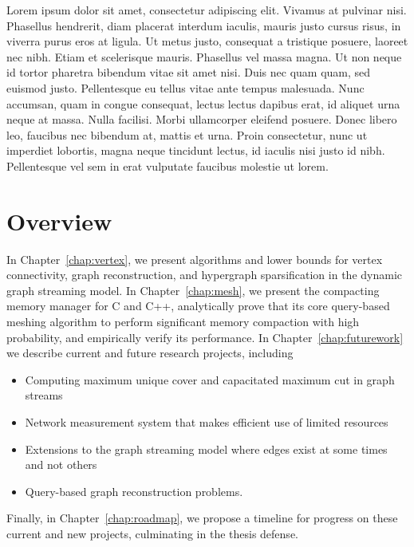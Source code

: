 \label{chap:intro}


Lorem ipsum dolor sit amet, consectetur adipiscing elit. Vivamus at pulvinar nisi. Phasellus hendrerit, diam placerat interdum iaculis, mauris justo cursus risus, in viverra purus eros at ligula. Ut metus justo, consequat a tristique posuere, laoreet nec nibh. Etiam et scelerisque mauris. Phasellus vel massa magna. Ut non neque id tortor pharetra bibendum vitae sit amet nisi. Duis nec quam quam, sed euismod justo. Pellentesque eu tellus vitae ante tempus malesuada. Nunc accumsan, quam in congue consequat, lectus lectus dapibus erat, id aliquet urna neque at massa. Nulla facilisi. Morbi ullamcorper eleifend posuere. Donec libero leo, faucibus nec bibendum at, mattis et urna. Proin consectetur, nunc ut imperdiet lobortis, magna neque tincidunt lectus, id iaculis nisi justo id nibh. Pellentesque vel sem in erat vulputate faucibus molestie ut lorem.\\

\section{Overview}

In Chapter~\ref{chap:vertex}, we present algorithms and lower bounds for vertex connectivity, graph reconstruction, and hypergraph sparsification in the dynamic graph streaming model.  In Chapter~\ref{chap:mesh}, we present the \Mesh compacting memory manager for C and C++, analytically prove that its core query-based meshing algorithm to perform significant memory compaction with high probability, and empirically verify its performance.  In Chapter~\ref{chap:futurework} we describe current and future research projects, including
\begin{itemize}
\item Computing maximum unique cover and capacitated maximum cut in graph streams
\item Network measurement system that makes efficient use of limited resources
\item Extensions to the graph streaming model where edges exist at some times and not others
\item Query-based graph reconstruction problems.
\end{itemize}

Finally, in Chapter~\ref{chap:roadmap}, we propose a timeline for progress on these current and new projects, culminating in the thesis defense.